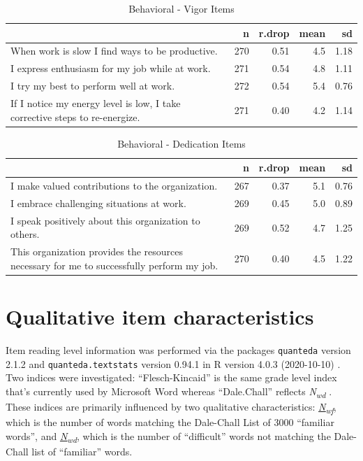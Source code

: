 \documentclass[
]{book}
\begin{document}
\begin{table}

\caption{\label{tab:rdrop14}Behavioral - Vigor Items}
\centering
\begin{tabular}[t]{l|r|r|r|r}
\hline
  & n & r.drop & mean & sd\\
\hline
When work is slow I find ways to be productive. & 270 & 0.51 & 4.5 & 1.18\\
\hline
I express enthusiasm for my job while at work. & 271 & 0.54 & 4.8 & 1.11\\
\hline
I try my best to perform well at work. & 272 & 0.54 & 5.4 & 0.76\\
\hline
If I notice my energy level is low, I take corrective steps to re-energize. & 271 & 0.40 & 4.2 & 1.14\\
\hline
\end{tabular}
\end{table}

\begin{table}

\caption{\label{tab:rdrop15}Behavioral - Dedication Items}
\centering
\begin{tabular}[t]{l|r|r|r|r}
\hline
  & n & r.drop & mean & sd\\
\hline
I make valued contributions to the organization. & 267 & 0.37 & 5.1 & 0.76\\
\hline
I embrace challenging situations at work. & 269 & 0.45 & 5.0 & 0.89\\
\hline
I speak positively about this organization to others. & 269 & 0.52 & 4.7 & 1.25\\
\hline
This organization provides the resources necessary for me to successfully perform my job. & 270 & 0.40 & 4.5 & 1.22\\
\hline
\end{tabular}
\end{table}

\hypertarget{qualitative}{%
\chapter{Qualitative item characteristics}\label{qualitative}}

Item reading level information was performed via the packages \texttt{quanteda} version 2.1.2 \citep{R-quanteda} and \texttt{quanteda.textstats} version 0.94.1 \citep{R-quanteda.textstats} in R version 4.0.3 (2020-10-10) \citep{R-base}. Two indices were investigated: ``Flesch-Kincaid'' is the same grade level index that's currently used by Microsoft Word \citep{kincaid_derivation_1975} whereas ``Dale.Chall'' reflects \emph{N\textsubscript{wd}} \citep[``difficulty'' of words;][]{chall_dale_1995}. These indices are primarily influenced by two qualitative characteristics: \href{https://quanteda.io/reference/textstat_readability.html}{\emph{N\textsubscript{wf}}}, which is the number of words matching the Dale-Chall List of 3000 ``familiar words'', and \href{https://quanteda.io/reference/textstat_readability.html}{\emph{N\textsubscript{wd}}}, which is the number of ``difficult'' words not matching the Dale-Chall list of ``familiar'' words.
\end{document}
